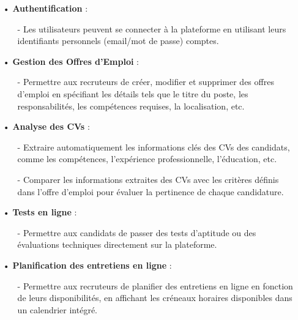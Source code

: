 \begin{itemize}
    \setlength{\itemsep}{0.3cm}
   \item[•] \textbf{Authentification} :
   \begin{itemize}
    \setlength{\itemsep}{0.2cm}
       \item[-] Les utilisateurs peuvent se connecter à la plateforme en utilisant leurs identifiants personnels (email/mot de passe) comptes.
   \end{itemize}
   \item[•] \textbf{Gestion des Offres d'Emploi} :
   \begin{itemize}
    \setlength{\itemsep}{0.2cm}
       \item[-] Permettre aux recruteurs de créer, modifier et supprimer des offres d'emploi en spécifiant les détails tels que le titre du poste, les responsabilités, les compétences requises, la localisation, etc.
   \end{itemize}
   
   \item[•] \textbf{Analyse des CVs} :
   \begin{itemize}
    \setlength{\itemsep}{0.2cm}
       \item[-] Extraire automatiquement les informations clés des CVs des candidats, comme les compétences, l'expérience professionnelle, l'éducation, etc.
       \item[-] Comparer les informations extraites des CVs avec les critères définis dans l'offre d'emploi pour évaluer la pertinence de chaque candidature.
   \end{itemize}
   
   \item[•] \textbf{Tests en ligne} :
   \begin{itemize}
    \setlength{\itemsep}{0.2cm}
       \item[-] Permettre aux candidats de passer des tests d'aptitude ou des évaluations techniques directement sur la plateforme.
   \end{itemize}
   
   \item[•] \textbf{Planification des entretiens en ligne} :
   \begin{itemize}
    \setlength{\itemsep}{0.2cm}
       \item[-] Permettre aux recruteurs de planifier des entretiens en ligne 
       en fonction de leurs disponibilités, 
       en affichant les créneaux horaires disponibles dans un 
       calendrier intégré.
   \end{itemize}
   

\end{itemize}
